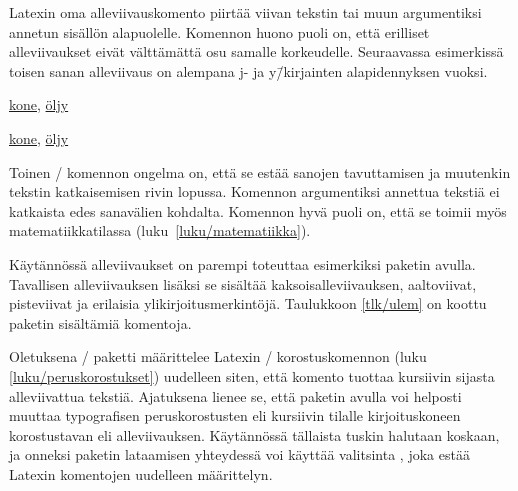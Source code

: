 Latexin oma alleviivauskomento  piirtää viivan
tekstin tai muun argumentiksi annetun sisällön alapuolelle. Komennon
huono puoli on, että erilliset alleviivaukset eivät välttämättä osu
samalle korkeudelle. Seuraavassa esimerkissä toisen sanan alleviivaus on
alempana j- ja y\=/kirjainten alapidennyksen vuoksi.

\begin{koodilohkosis}
\underline{kone}, \underline{öljy}
\end{koodilohkosis}

\begin{tulossis}
  \underline{kone}, \underline{öljy}
\end{tulossis}

\noindent
Toinen \-/ komennon ongelma on, että se estää sanojen
tavuttamisen ja muutenkin tekstin katkaisemisen rivin lopussa. Komennon
argumentiksi annettua tekstiä ei katkaista edes sanavälien kohdalta.
Komennon hyvä puoli on, että se toimii myös matematiikkatilassa
(luku~\ref{luku/matematiikka}).

Käytännössä alleviivaukset on parempi toteuttaa esimerkiksi paketin
 avulla. Tavallisen alleviivauksen lisäksi se sisältää
kaksoisalleviivauksen, aaltoviivat, pisteviivat ja erilaisia
ylikirjoitusmerkintöjä. Taulukkoon \ref{tlk/ulem} on koottu paketin
sisältämiä komentoja.


Oletuksena \-/ paketti määrittelee Latexin
\-/ korostuskomennon (luku \ref{luku/peruskorostukset})
uudelleen siten, että komento tuottaa kursiivin sijasta alleviivattua
tekstiä. Ajatuksena lienee se, että paketin avulla voi helposti muuttaa
typografisen peruskorostusten eli kursiivin tilalle kirjoituskoneen
korostustavan eli alleviivauksen. Käytännössä tällaista tuskin halutaan
koskaan, ja onneksi paketin lataamisen yhteydessä voi käyttää valitsinta
, joka estää Latexin komentojen uudelleen
määrittelyn.

